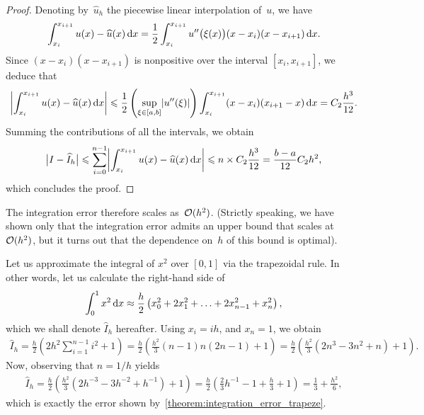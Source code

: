 \begin{proof}
Denoting by~$\widehat u_h$ the piecewise linear interpolation of~$u$,
we have
\[
    \int_{x_{i}}^{x_{i+1}} u(x) - \widehat u(x) \, \mathrm d x
    = \frac{1}{2} \int_{x_{i}}^{x_{i+1}} u''\bigl(\xi(x)\bigr) (x - x_{i}) (x - x_{i+1}) \, \mathrm d x.
\]
Since $(x - x_i) (x - x_{i+1})$ is nonpositive over the interval $[x_i, x_{i+1}]$,
we deduce that
\[
    \abs*{\int_{x_{i}}^{x_{i+1}} u(x) - \widehat u(x) \, \d x}
    \leq \frac{1}{2} \left( \sup_{\xi \in [a, b]} \abs*{u''(\xi)} \right) \int_{x_{i}}^{x_{i+1}} (x - x_{i}) (x_{i+1} - x) \, \d x
    = C_2 \frac{h^3}{12}.
\]
Summing the contributions of all the intervals,
we obtain
\[
    \bigl\lvert I - \widehat I_h \bigr\rvert
    \leq \sum_{i=0}^{n-1} \abs*{\int_{x_i}^{x_{i+1}} u(x) - \widehat u(x) \, \d x }
    \leq n \times C_2 \frac{h^3}{12} = \frac{b-a}{12} C_2 h^2,
\]
which concludes the proof.
\end{proof}

The integration error therefore scales as~$\mathcal O(h^2)$.
(Strictly speaking, we have shown only that the integration error admits an upper bound that scales at $\mathcal O(h^2)$,
but it turns out that the dependence on~$h$ of this bound is optimal).

\begin{example}
    Let us approximate the integral of $x^2$ over $[0, 1]$
    via the trapezoidal rule.
    In other words, let us calculate the right-hand side of
    \[
        \int_0^1 x^2 \, \mathrm d x
        \approx
        \frac h 2 \left(x_0^2 + 2 x_1^2 + \dotsc + 2 x_{n - 1}^2 + x_n^2\right),
    \]
    which we shall denote $\widehat I_h$ hereafter.
    Using $x_i = ih$, and $x_n = 1$, we obtain
    \begin{align*}
        \widehat I_h = \frac h 2\left( 2 h^2 \sum_{i = 1}^{n - 1} i^2 + 1\right)
        = \frac h 2 \left( \frac {h^2} 3 (n - 1) n (2n - 1) + 1\right)
        = \frac h 2 \left( \frac {h^2} 3 (2 n^3 - 3 n^2 + n) + 1 \right).
    \end{align*}
    Now, observing that $n = 1 / h$ yields
    \begin{align*}
        \widehat I_h
        = \frac h 2 \left( \frac {h^2} 3 (2 h^{-3} - 3 h^{-2} + h^{-1}) + 1 \right)
        = \frac h 2 \left( \frac 2 3 h^{-1} - 1 + \frac h 3 + 1 \right)
        = \frac 1 3 + \frac {h^2} 6,
    \end{align*}
    which is exactly the error shown by~\cref{theorem:integration_error_trapeze}.
\end{example}

